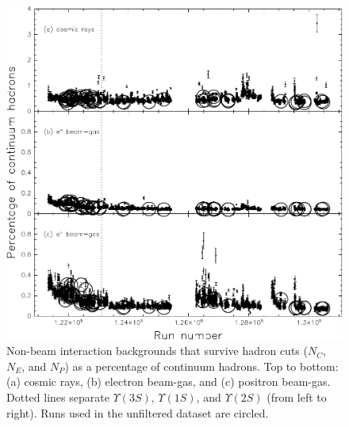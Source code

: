 \begin{figure}[p]
  \begin{center}
    \includegraphics[width=\linewidth]{plots/datasets_databasecontamination}
  \end{center}
  \caption{\label{datasets_databasecontamination} Non-beam interaction
    backgrounds that survive hadron cuts ($N_C$, $N_E$, and $N_P$) as
    a percentage of continuum hadrons.  Top to bottom: (a) cosmic
    rays, (b) electron beam-gas, and (c) positron beam-gas.  Dotted
    lines separate $\Upsilon(3S)$, $\Upsilon(1S)$, and $\Upsilon(2S)$
    (from left to right).  Runs used in the unfiltered dataset are
    circled.}
\end{figure}

